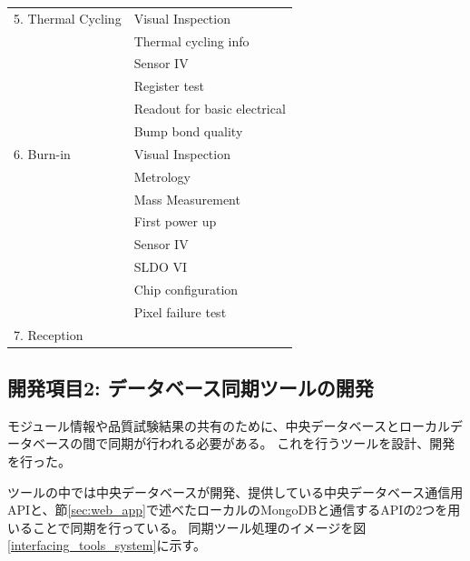 \begin{table}[btp]
\begin{center}
\begin{tabular}{|ll|}
    5. Thermal Cycling      & Visual Inspection \\ 
                            & Thermal cycling info \\
                            & Sensor IV \\
                            & Register test\\
                            & Readout for basic electrical \\
                            & Bump bond quality \\\hline

    6. Burn-in              & Visual Inspection \\ 
                            & Metrology \\
                            & Mass Measurement \\
                            & First power up\\
                            & Sensor IV\\
                            & SLDO VI\\
                            & Chip configuration\\
                            & Pixel failure test\\\hline

    7. Reception            & \\\hline 
  \end{tabular}
\end{center}
\end{table}


\clearpage

\subsection{開発項目2: データベース同期ツールの開発} \label{sec:interfacing_tool}
モジュール情報や品質試験結果の共有のために、中央データベースとローカルデータベースの間で同期が行われる必要がある。
これを行うツールを設計、開発を行った。

ツールの中では中央データベースが開発、提供している中央データベース通信用APIと、節\ref{sec:web_app}で述べたローカルのMongoDBと通信するAPIの2つを用いることで同期を行っている。
同期ツール処理のイメージを図\ref{interfacing_tools_system}に示す。

